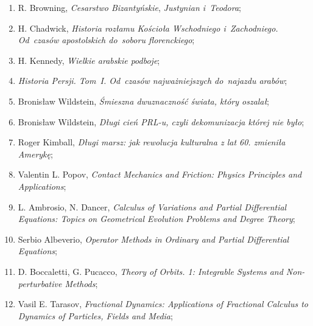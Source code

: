 \documentclass[a4paper,11pt]{article}
\begin{document}
\begin{enumerate}
\item R. Browning, \textit{Cesarstwo Bizantyńskie}, \textit{Justynian
    i~Teodora};



\item H. Chadwick, \textit{Historia rozłamu Kościoła Wschodniego
    i~Zachodniego. Od~czasów apostolskich do~soboru florenckiego};



\item H. Kennedy, \textit{Wielkie arabskie podboje};



\item \textit{Historia Persji. Tom~I. Od~czasów najważniejszych
    do~najazdu arabów};



\item Bronisław Wildstein, \textit{Śmieszna dwuznaczność świata, który
    oszalał};



\item Bronisław Wildstein, \textit{Długi cień PRL-u, czyli dekomunizacja
    której nie było};



\item Roger Kimball, \textit{Długi marsz: jak rewolucja kulturalna z lat
    60. zmieniła Amerykę};




\item Valentin L. Popov, \textit{Contact Mechanics and Friction: Physics
    Principles and Applications};



\item L. Ambrosio, N. Dancer, \textit{Calculus of Variations and Partial
    Differential Equations: Topics on Geometrical Evolution Problems
    and Degree Theory};



\item Serbio Albeverio, \textit{Operator Methods in Ordinary and Partial
    Differential Equations};



\item D. Boccaletti, G. Pucacco, \textit{Theory of Orbits. 1: Integrable
    Systems and Non-perturbative Methods};



\item Vasil E. Tarasov, \textit{Fractional Dynamics: Applications of
    Fractional Calculus to Dynamics of Particles, Fields and Media};




\end{enumerate}
\end{document}
